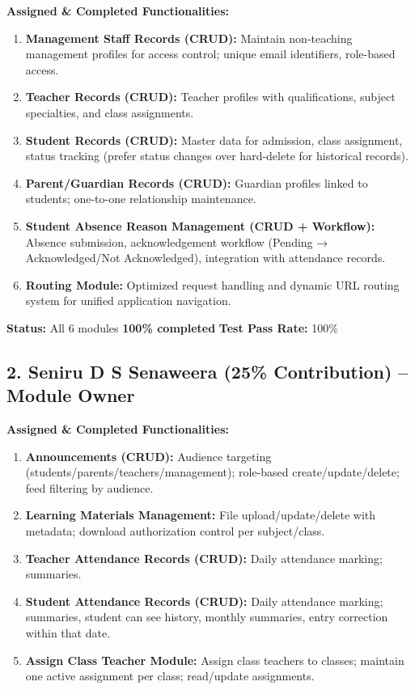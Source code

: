 \documentclass[11pt, a4paper]{article}
\begin{document}
\textbf{Assigned \& Completed Functionalities:}
\begin{enumerate}[itemsep=1pt, topsep=2pt, leftmargin=15pt]
    \item \textbf{Management Staff Records (CRUD):} Maintain non-teaching management profiles for access control; unique email identifiers, role-based access.
    \item \textbf{Teacher Records (CRUD):} Teacher profiles with qualifications, subject specialties, and class assignments.
    \item \textbf{Student Records (CRUD):} Master data for admission, class assignment, status tracking (prefer status changes over hard-delete for historical records).
    \item \textbf{Parent/Guardian Records (CRUD):} Guardian profiles linked to students; one-to-one relationship maintenance.
    \item \textbf{Student Absence Reason Management (CRUD + Workflow):} Absence submission, acknowledgement workflow (Pending → Acknowledged/Not Acknowledged), integration with attendance records.
    \item \textbf{Routing Module:} Optimized request handling and dynamic URL routing system for unified application navigation.
\end{enumerate}

\textbf{Status:} All 6 modules \textbf{100\% completed} \quad \textbf{Test Pass Rate:} 100\%

\vspace{0.3cm}

\subsection*{2. Seniru D S Senaweera (25\% Contribution) -- Module Owner}

\textbf{Assigned \& Completed Functionalities:}
\begin{enumerate}[itemsep=1pt, topsep=2pt, leftmargin=15pt]
    \item \textbf{Announcements (CRUD):} Audience targeting (students/parents/teachers/management); role-based create/update/delete; feed filtering by audience.
    \item \textbf{Learning Materials Management:} File upload/update/delete with metadata; download authorization control per subject/class.
    \item \textbf{Teacher Attendance Records (CRUD):} Daily attendance marking; summaries.
    \item \textbf{Student Attendance Records (CRUD):} Daily attendance marking; summaries, student can see history, monthly summaries, entry correction within that date.
    \item \textbf{Assign Class Teacher Module:} Assign class teachers to classes; maintain one active assignment per class; read/update assignments.
\end{enumerate}
\end{document}
